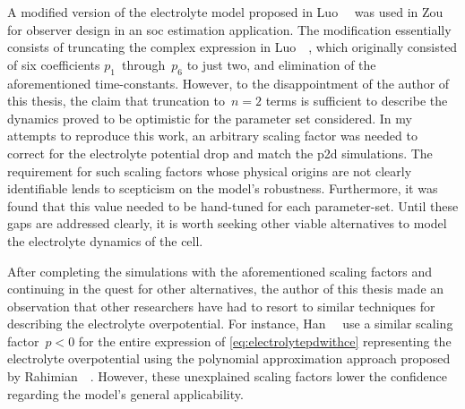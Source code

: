A modified version of the electrolyte model proposed in Luo~\etal~\cite{Luo2013}
was  used  in Zou~\etal~\cite{Zou2016a}  for  observer  design in  an  \gls{soc}
estimation application. The modification  essentially consists of truncating the
complex expression  in Luo~\etal~\cite{Luo2013},  which originally  consisted of
six  coefficients  $p_1$~through~$p_6$  to  just two,  and  elimination  of  the
aforementioned time-constants. However,  to the disappointment of  the author of
this thesis, the claim that truncation  to~$n=2$ terms is sufficient to describe
the dynamics  proved to be  optimistic for the  parameter set considered.  In my
attempts  to reproduce  this work,  an arbitrary  scaling factor  was needed  to
correct for the electrolyte potential  drop and match the \gls{p2d} simulations.
The requirement for such scaling factors  whose physical origins are not clearly
identifiable lends to scepticism on  the model's robustness. Furthermore, it was
found that  this value  needed to  be hand-tuned  for each  parameter-set. Until
these gaps are addressed clearly, it  is worth seeking other viable alternatives
to model the electrolyte dynamics of the cell.

After  completing  the  simulations  with  the  aforementioned  scaling  factors
and  continuing  in  the  quest  for other  alternatives,  the  author  of  this
thesis  made  an observation  that  other  researchers  have  had to  resort  to
similar techniques  for describing the electrolyte  overpotential. For instance,
Han~\etal~\cite{Han2015a} use  a similar  scaling factor~${p<0}$ for  the entire
expression   of  \cref{eq:electrolytepdwithce}   representing  the   electrolyte
overpotential   using  the   polynomial  approximation   approach  proposed   by
Rahimian~\etal~\cite{KhaleghiRahimian2013}.  However, these  unexplained scaling
factors lower the confidence regarding the model's general applicability.


